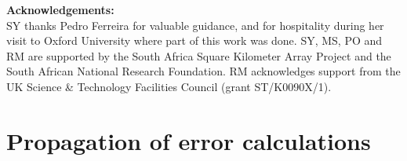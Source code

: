 \documentclass[useAMS,usenatbib]{mn2e}
\begin{document}
%
% 
%


\newpage
\[\]
{\bf Acknowledgements:}\\
SY thanks Pedro Ferreira for valuable guidance, and for hospitality during her visit to Oxford University where part of this work was done.
SY, MS, PO and
RM are supported by the South Africa Square Kilometer Array Project and  the South African National Research Foundation. RM acknowledges support from the UK Science \& Technology Facilities Council (grant ST/K0090X/1).
\newpage




\newpage

\appendix

\section{Propagation of error calculations}
\end{document}
